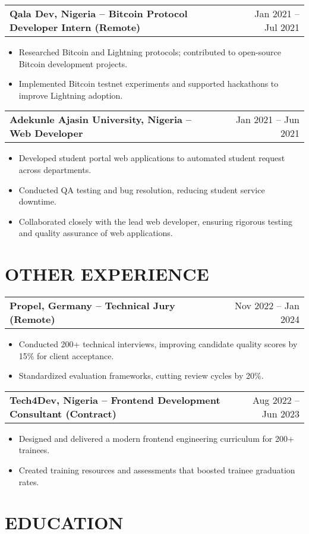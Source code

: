 \documentclass[a4paper,12pt]{article}
\makeatletter
\newenvironment{joblong}[2]
    {
    \begin{tabularx}{\linewidth}{@{}l X r@{}}
    \textbf{#1} & \hfill &  #2 \\[3.75pt]
    \end{tabularx}
    \begin{minipage}[t]{\linewidth}
    \begin{itemize}[nosep,after=\strut, leftmargin=1em, itemsep=3pt,label=--]
    }
    {
    \end{itemize}
    \end{minipage}    
    }
\makeatother
\begin{document}
\begin{joblong}{Qala Dev, Nigeria -- Bitcoin Protocol Developer Intern (Remote)}{Jan 2021 -- Jul 2021}
\item Researched Bitcoin and Lightning protocols; contributed to open-source Bitcoin development projects.
\item Implemented Bitcoin testnet experiments and supported hackathons to improve Lightning adoption.
\end{joblong}

\begin{joblong}{Adekunle Ajasin University, Nigeria -- Web Developer}{Jan 2021 -- Jun 2021}
\item Developed student portal web applications to automated student request across departments.
\item Conducted QA testing and bug resolution, reducing student service downtime.
\item Collaborated closely with the lead web developer, ensuring rigorous testing and quality assurance of web applications.
\end{joblong}

\section{OTHER EXPERIENCE}

\begin{joblong}{Propel, Germany -- Technical Jury (Remote)}{Nov 2022 -- Jan 2024}
\item Conducted 200+ technical interviews, improving candidate quality scores by 15\% for client acceptance.
\item Standardized evaluation frameworks, cutting review cycles by 20\%.
\end{joblong}

\begin{joblong}{Tech4Dev, Nigeria -- Frontend Development Consultant (Contract)}{Aug 2022 -- Jun 2023}
\item Designed and delivered a modern frontend engineering curriculum for 200+ trainees.
\item Created training resources and assessments that boosted trainee graduation rates.
\end{joblong}


\section{EDUCATION}
\end{document}
